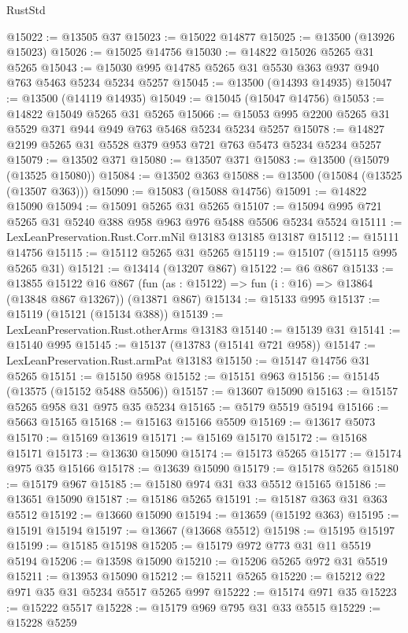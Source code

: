 \begin{lexlean}{RustStd}
\begin{coremodule}
@15022 := @13505 @37
@15023 := @15022 @14877
@15025 := @13500 (@13926 @15023)
@15026 := @15025 @14756
@15030 := @14822 @15026 @5265 @31 @5265
@15043 := @15030 @995 @14785 @5265 @31 @5530 @363 @937 @940 @763 @5463 @5234 @5234 @5257
@15045 := @13500 (@14393 @14935)
@15047 := @13500 (@14119 @14935)
@15049 := @15045 (@15047 @14756)
@15053 := @14822 @15049 @5265 @31 @5265
@15066 := @15053 @995 @2200 @5265 @31 @5529 @371 @944 @949 @763 @5468 @5234 @5234 @5257
@15078 := @14827 @2199 @5265 @31 @5528 @379 @953 @721 @763 @5473 @5234 @5234 @5257
@15079 := @13502 @371
@15080 := @13507 @371
@15083 := @13500 (@15079 (@13525 @15080))
@15084 := @13502 @363
@15088 := @13500 (@15084 (@13525 (@13507 @363)))
@15090 := @15083 (@15088 @14756)
@15091 := @14822 @15090
@15094 := @15091 @5265 @31 @5265
@15107 := @15094 @995 @721 @5265 @31 @5240 @388 @958 @963 @976 @5488 @5506 @5234 @5524
@15111 := LexLeanPreservation.Rust.Corr.mNil @13183 @13185 @13187
@15112 := @15111 @14756
@15115 := @15112 @5265 @31 @5265
@15119 := @15107 (@15115 @995 @5265 @31)
@15121 := @13414 (@13207 @867)
@15122 := @6 @867
@15133 := @13855
    @15122
    @16
    @867
    (fun (as : @15122) => fun (i : @16) => @13864 (@13848 @867 @13267))
    (@13871 @867)
@15134 := @15133 @995
@15137 := @15119 (@15121 (@15134 @388))
@15139 := LexLeanPreservation.Rust.otherArms @13183
@15140 := @15139 @31
@15141 := @15140 @995
@15145 := @15137 (@13783 (@15141 @721 @958))
@15147 := LexLeanPreservation.Rust.armPat @13183
@15150 := @15147 @14756 @31 @5265
@15151 := @15150 @958
@15152 := @15151 @963
@15156 := @15145 (@13575 (@15152 @5488 @5506))
@15157 := @13607 @15090
@15163 := @15157 @5265 @958 @31 @975 @35 @5234
@15165 := @5179 @5519 @5194
@15166 := @5663 @15165
@15168 := @15163 @15166 @5509
@15169 := @13617 @5073
@15170 := @15169 @13619
@15171 := @15169 @15170
@15172 := @15168 @15171
@15173 := @13630 @15090
@15174 := @15173 @5265
@15177 := @15174 @975 @35 @15166
@15178 := @13639 @15090
@15179 := @15178 @5265
@15180 := @15179 @967
@15185 := @15180 @974 @31 @33 @5512 @15165
@15186 := @13651 @15090
@15187 := @15186 @5265
@15191 := @15187 @363 @31 @363 @5512
@15192 := @13660 @15090
@15194 := @13659 (@15192 @363)
@15195 := @15191 @15194
@15197 := @13667 (@13668 @5512)
@15198 := @15195 @15197
@15199 := @15185 @15198
@15205 := @15179 @972 @773 @31 @11 @5519 @5194
@15206 := @13598 @15090
@15210 := @15206 @5265 @972 @31 @5519
@15211 := @13953 @15090
@15212 := @15211 @5265
@15220 := @15212 @22 @971 @35 @31 @5234 @5517 @5265 @997
@15222 := @15174 @971 @35
@15223 := @15222 @5517
@15228 := @15179 @969 @795 @31 @33 @5515
@15229 := @15228 @5259

\end{coremodule}
\end{lexlean}
